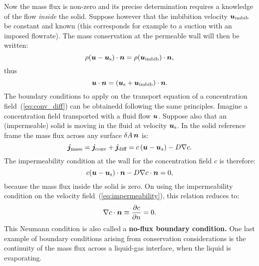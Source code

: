 Now the mass flux is non-zero and its precise determination requires a knowledge of the flow \textit{inside} the solid. Suppose however that the imbibition velocity $\bu_\text{imbib}$ be constant and known (this corresponds for example to a suction with an imposed flowrate). The mass conservation at the permeable wall will then be written:
\begin{equation}
\rho (\bu-\bu_\text s) \cdot \bn = \rho (\bu_\text{imbib}) \cdot \bn,
\end{equation}
thus 
\begin{equation}
\bu\cdot\bn = \lp\bu_\text s + \bu_\text{imbib}\rp\cdot\bn.
\end{equation}
The boundary conditions to apply on the transport equation of a concentration field~(\ref{eq:conv_diff}) can be obtainedd following the same principles. Imagine a concentration field transported with a fluid flow $\bu$. Suppose also that an (impermeable) solid is moving in the fluid at velocity $\bu_\text s$. In the solid reference frame the mass flux across any surface $\delA \,\bn$ is:
\begin{equation}
\bj_\text{mass} = \bj_\text{conv} + \bj_\text{diff} = c \lp \bu - \bu_s\rp - D \nabla c.
\end{equation}
The impermeability condition at the wall for the concentration field $c$ is therefore:
\begin{equation}
c (\bu-\bu_\text s) \cdot \bn - D \nabla c \cdot \bn = 0,
\end{equation}
because the mass flux inside the solid is zero.
On using the impermeability condition on the velocity field~(\ref{eq:impermeability}), this relation reduces to:
\begin{equation}
\nabla c \cdot \bn \equiv \pd{c}{n} = 0.
\end{equation}
This Neumann condition is also called a \textbf{no-flux boundary condition.}
 One last example of boundary conditions arising from conservation considerations is the continuity of the mass flux across a liquid-gas interface, when the liquid is evaporating.

